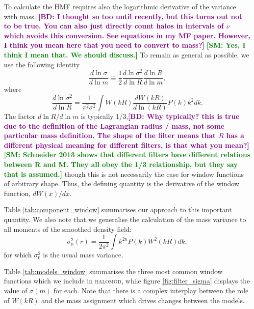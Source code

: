 \documentclass[5p]{elsarticle}
\newcommand{\bd}[1]{\textcolor{purple}{\textbf{[BD: #1]}}}
\newcommand{\sgm}[1]{\textcolor{green}{\textbf{[SM: #1]}}}
\begin{document}
To calculate the HMF requires also the logarithmic derivative of the variance with mass. \bd{I thought so too until recently, but this turns out not to be true. You can also just directly count halos in intervals of $\nu$ which avoids this conversion. See equations in my MF paper. However, I think you mean here that you need to convert to mass?} \sgm{Yes, I think I mean that. We should discuss.} To remain as general as possible, we use the following identity
\begin{equation}
    \label{eq:dlnssdlnm}
     \frac{d \ln \sigma}{d \ln m} \equiv \frac{1}{2}\frac{d \ln \sigma^2}{d \ln R} \frac{d \ln R}{d \ln m},
\end{equation}
where 
\begin{equation}
    \label{eq:dlnssdlnr}
    \frac{d\ln \sigma^2}{d\ln R} = \frac{1}{\pi^2 \sigma^2}\int W(kR) \frac{dW(kR)}{d\ln (kR)} P(k) k^2 dk.
\end{equation}
The factor $d\ln R/d\ln m$ is typically 1/3,\bd{Why typically? this is true due to the definition of the Lagrangian radius / mass, not some particular mass definition. The shape of the filter means that $R$ has a different physical meaning for different filters, is that what you mean?} \sgm{Schneider 2013 shows that different filters have different relations between R and M. They all obey the 1/3 relationship, but they say that is assumed.} though this is not necessarily the case for window functions of arbitrary shape. Thus, the defining quantity is the derivative of the window function, $dW(x)/dx$. 

Table \ref{tab:component_window} summarises our approach to this important quantity. We also note that we generalise the calculation of the mass variance to all moments of the smoothed density field:
\begin{equation}
    \label{eq:moments}
    \sigma_n^2(r) = \frac{1}{2\pi^2}\int k^{2n} P(k) W^2(kR) dk,
\end{equation}
for which $\sigma_0^2$ is the usual mass variance.

Table \ref{tab:models_window} summarises the three most common window functions which we include in \textsc{halomod}, while figure \ref{fig:filter_sigma} displays the value of $\sigma(m)$ for each. Note that there is a complex interplay between the role of $W(kR)$ and the mass assignment which drives changes between the models.
\end{document}
